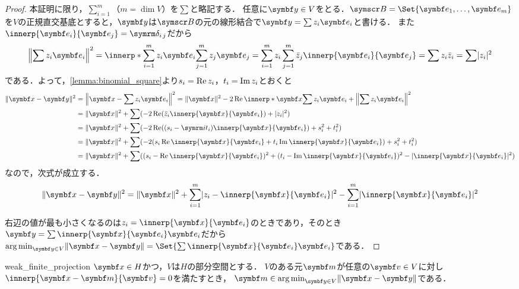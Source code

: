 \documentclass[../../main]{subfiles}
\begin{document}
\begin{proof}
  本証明に限り，\(\sum_{i=1}^m\)（\(m=\dim V\)）を\(\sum\)と略記する．
  任意に\(\vect{y}\in V\)をとる．\(\basis{B}=\Set{\vect{e}_1,\dots,\vect{e}_m}\)を\(V\)の正規直交基底とすると，\(\vect{y}\)は\(\basis{B}\)の元の線形結合で\(\vect{y}=\sum z_i\vect{e}_i\)と書ける．
  また\(\innerp{\vect{e}_i}{\vect{e}_j}=\kdelta{i}{j}\)だから
  \[
    \vnorm*{\sum z_i\vect{e}_i}^2 = \innerp*{\sum_{i=1}^mz_i\vect{e}_i}{\sum_{j=1}^mz_j\vect{e}_j}
    = \sum_{i=1}^mz_i\sum_{j=1}^m\conj{z}_j\innerp{\vect{e}_i}{\vect{e}_j}
    = \sum z_i\conj{z}_i
    = \sum\abs{z_i}^2
  \]
  である．よって，\cref{lemma:binomial_square}より\(s_i=\operatorname{Re} z_i\)，\(t_i=\operatorname{Im} z_i\)とおくと
  \begin{align*}
    \vnorm{\vect{x}-\vect{y}}^2 &= \vnorm*{\vect{x}-\sum z_i\vect{e}_i}^2
    = \vnorm{\vect{x}}^2-2\rpart\innerp*{\vect{x}}{\sum z_i\vect{e}_i}+\vnorm*{\sum z_i\vect{e}_i}^2 \\
    &= \vnorm{\vect{x}}^2+\sum(-2\rpart(\conj{z}_i\innerp{\vect{x}}{\vect{e}_i})+\abs{z_i}^2) \\
    &= \vnorm{\vect{x}}^2+\sum(-2\rpart((s_i-\iuni t_i)\innerp{\vect{x}}{\vect{e}_i})+s_i^2+t_i^2) \\
    &= \vnorm{\vect{x}}^2+\sum(-2(s_i\rpart\innerp{\vect{x}}{\vect{e}_i}+t_i\ipart\innerp{\vect{x}}{\vect{e}_i})+s_i^2+t_i^2) \\
    &= \vnorm{\vect{x}}^2+\sum((s_i-\rpart\innerp{\vect{x}}{\vect{e}_i})^2+(t_i-\ipart\innerp{\vect{x}}{\vect{e}_i})^2-\abs{\innerp{\vect{x}}{\vect{e}_i}}^2)
  \end{align*}
  なので，次式が成立する．
  \begin{equation}
    \label{equation:pre_bessels_inequality}
    \vnorm{\vect{x}-\vect{y}}^2 = \vnorm{\vect{x}}^2+\sum_{i=1}^m\abs{z_i-\innerp{\vect{x}}{\vect{e}_i}}^2-\sum_{i=1}^m\abs{\innerp{\vect{x}}{\vect{e}_i}}^2
  \end{equation}

  右辺の値が最も小さくなるのは\(z_i=\innerp{\vect{x}}{\vect{e}_i}\)のときであり，そのとき\(\vect{y}=\sum\innerp{\vect{x}}{\vect{e}_i}\vect{e}_i\)だから
  \(\argmin_{\vect{y}\in V}\vnorm{\vect{x}-\vect{y}}=\Set{\sum\innerp{\vect{x}}{\vect{e}_i}\vect{e}_i}\)である．
\end{proof}

\begin{proposition}{}{weak_finite_projection}
  \(\vect{x}\in H\)かつ，\(V\)は\(H\)の部分空間とする．
  \(V\)のある元\(\vect{m}\)が任意の\(\vect{v}\in V\)に対し\(\innerp{\vect{x}-\vect{m}}{\vect{v}}=0\)を満たすとき，
  \(\vect{m}\in\argmin_{\vect{y}\in V}\vnorm{\vect{x}-\vect{y}}\)である．
\end{proposition}
\end{document}
